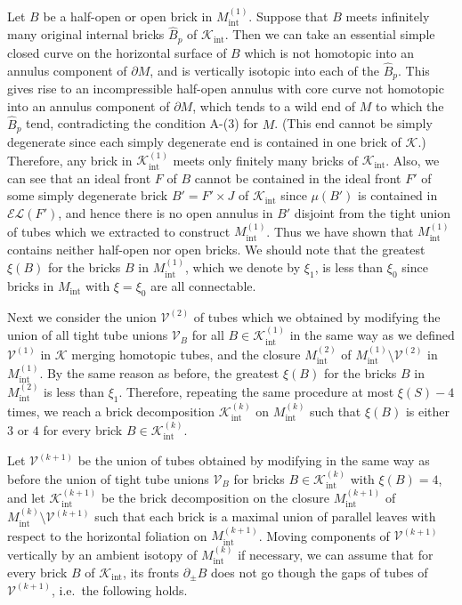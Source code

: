 \documentclass{amsart}
\theoremstyle{definition}
\numberwithin{figure}{section}
\numberwithin{equation}{section}
\newcommand{\ie}{i.e.\ }
\newcommand{\EL}{\mathcal{EL}}
\def\ck{\mathcal{K}}
\def\cv{\mathcal{V}}
\begin{document}
Let $B$ be a half-open  or open brick in $M_{\mathrm{int}}^{(1)}$.
Suppose that $B$ meets infinitely many original internal bricks $\hat B_p$ of $\ck_{\mathrm{int}}$. 
Then we can take an essential simple closed curve on the horizontal surface of $B$ which is not  homotopic into an annulus component of $\partial M$, and is vertically isotopic into each of the $\hat B_p$.
This gives rise to an incompressible half-open annulus with core curve not homotopic into  an annulus component of $\partial M$, which tends to a wild end of $M$ to which  the $\hat B_p$ tend, contradicting the condition A-(3) for $M$.
(This end cannot be simply degenerate since each simply degenerate end is contained in one brick of $\ck$.)
Therefore, any brick in $\ck_{\mathrm{int}}^{(1)}$ meets only finitely many bricks of $\ck_{\mathrm{int}}$.
Also, we can see that an ideal front $F$ of $B$ cannot be contained in  the ideal front $F'$ of some simply degenerate brick $B'=F' \times J$ of $\ck_\mathrm{int}$ since $\mu(B')$ is contained in $\EL(F')$, and hence there is no open annulus in $B'$ disjoint from the tight union of tubes which we extracted to construct $M_{\mathrm{int}}^{(1)}$.
Thus we have shown that $M_{\mathrm{int}}^{(1)}$ contains neither half-open nor open bricks.
We should note that the greatest $\xi(B)$ for the bricks $B$ in $M_{\mathrm{int}}^{(1)}$, which we denote by $\xi_1$, is less than $\xi_0$ since bricks in $M_\mathrm{int}$ with $\xi=\xi_0$ are all connectable.

Next we consider the union $\cv^{(2)}$ of tubes which we obtained by modifying the union of all tight tube unions $\cv_B$ for all $B\in \ck_{\mathrm{int}}^{(1)}$ in the same way as  we defined $\cv^{(1)}$ in $\ck$ merging homotopic tubes, and the closure $M_{\mathrm{int}}^{(2)}$ of $M_{\mathrm{int}}^{(1)} 
\setminus \cv^{(2)}$ in $M_{\mathrm{int}}^{(1)}$.
By the same reason as before, the greatest $\xi(B)$ for the bricks $B$ in $M_\mathrm{int}^{(2)}$ is less than $\xi_1$.
Therefore, repeating the same procedure  at most $\xi(S)-4$ times, we reach a brick decomposition 
$\ck_{\mathrm{int}}^{(k)}$ on $M_{\mathrm{int}}^{(k)}$ such that $\xi(B)$ is 
either $3$ or $4$ for every brick $B\in \ck_{\mathrm{int}}^{(k)}$.

Let $\cv^{(k+1)}$ be the union of tubes obtained by modifying in the same way as before the union of tight tube unions $\cv_B$ for bricks $B\in \ck_{\mathrm{int}}^{(k)}$ with 
$\xi(B)=4$, and let $\ck_{\mathrm{int}}^{(k+1)}$ be the brick decomposition on the closure 
$M_{\mathrm{int}}^{(k+1)}$ of $M_{\mathrm{int}}^{(k)}\setminus \cv^{(k+1)}$ such that each brick is a maximal union of  parallel leaves with respect to the horizontal foliation on $M^{(k+1)}_\mathrm{int}$.
Moving components of $\cv^{(k+1)}$ vertically by an ambient isotopy of $M_{\mathrm{int}}^{(k)}$ if necessary, we can assume that for every brick $B$ of $\ck_{\mathrm{int}}$, its fronts $\partial_\pm B$  does not go though the gaps of tubes of $\cv^{(k+1)}$, \ie the following holds.
\bigskip
\end{document}
